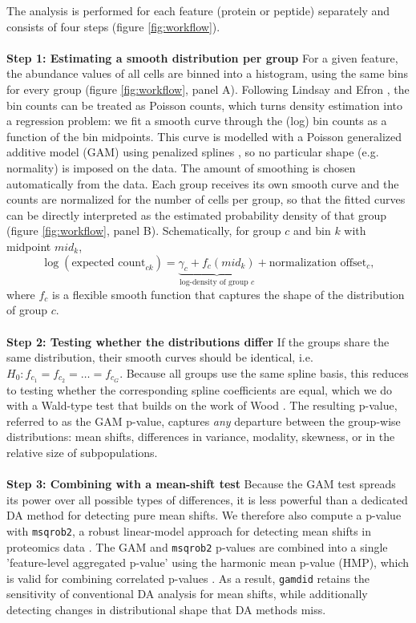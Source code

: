 The analysis is performed for each feature (protein or peptide) separately and consists of four steps (figure \ref{fig:workflow}).
\\
\\
\textbf{Step 1: Estimating a smooth distribution per group}
For a given feature, the abundance values of all cells are binned into a histogram, using the same bins for every group (figure \ref{fig:workflow}, panel A). Following Lindsay \cite{lindsay_method} and Efron \cite{efron}, the bin counts can be treated as Poisson counts, which turns density estimation into a regression problem: we fit a smooth curve through the (log) bin counts as a function of the bin midpoints. This curve is modelled with a Poisson generalized additive model (GAM) using penalized splines \cite{mgcv}, so no particular shape (e.g. normality) is imposed on the data. The amount of smoothing is chosen automatically from the data. Each group receives its own smooth curve and the counts are normalized for the number of cells per group, so that the fitted curves can be directly interpreted as the estimated probability density of that group (figure \ref{fig:workflow}, panel B). Schematically, for group $c$ and bin $k$ with midpoint $mid_k$,
\begin{equation*}
    \log(\text{expected count}_{ck}) = \underbrace{\gamma_c + f_c(mid_k)}_{\text{log-density of group } c} + \text{normalization offset}_c ,
\end{equation*}
where $f_c$ is a flexible smooth function that captures the shape of the distribution of group $c$.
\\
\\
\textbf{Step 2: Testing whether the distributions differ}
If the groups share the same distribution, their smooth curves should be identical, i.e. $H_0: f_{c_1} = f_{c_2} = \dots = f_{c_G}$. Because all groups use the same spline basis, this reduces to testing whether the corresponding spline coefficients are equal, which we do with a Wald-type test that builds on the work of Wood \cite{Wald}. The resulting p-value, referred to as the GAM p-value, captures \emph{any} departure between the group-wise distributions: mean shifts, differences in variance, modality, skewness, or in the relative size of subpopulations.
\\
\\
\textbf{Step 3: Combining with a mean-shift test}
Because the GAM test spreads its power over all possible types of differences, it is less powerful than a dedicated DA method for detecting pure mean shifts. We therefore also compute a p-value with \texttt{msqrob2}, a robust linear-model approach for detecting mean shifts in proteomics data \cite{msqrob}. The GAM and \texttt{msqrob2} p-values are combined into a single 'feature-level aggregated p-value' using the harmonic mean p-value (HMP), which is valid for combining correlated p-values \cite{harmonicp}. As a result, \texttt{gamdid} retains the sensitivity of conventional DA analysis for mean shifts, while additionally detecting changes in distributional shape that DA methods miss.
